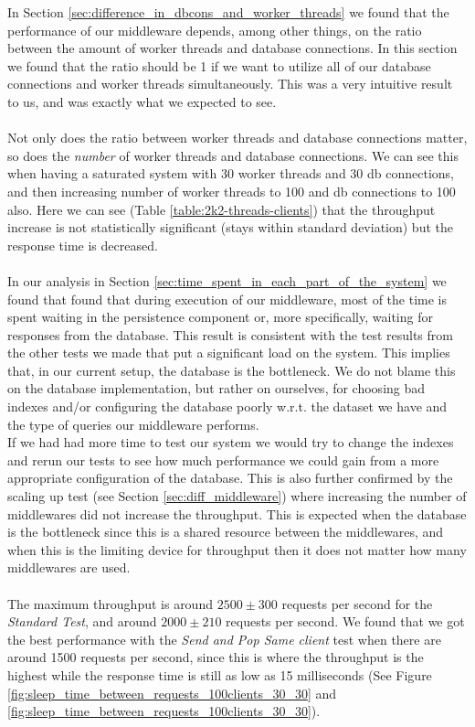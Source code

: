 \documentclass{article}
\begin{document}
        In Section \ref{sec:difference_in_dbcons_and_worker_threads} we found that the performance of our middleware depends, among other things, on the ratio between the amount of worker threads and database connections. In this section we found that the ratio should be 1 if we want to utilize all of our database connections and worker threads simultaneously. This was a very intuitive result to us, and was exactly what we expected to see.\\
        \\
        Not only does the ratio between worker threads and database connections matter, so does the \textit{number} of worker threads and database connections. We can see this when having a saturated system with 30 worker threads and 30 db connections, and then increasing number of worker threads to 100 and db connections to 100 also. Here we can see (Table \ref{table:2k2-threads-clients}) that the throughput increase is not statistically significant (stays within standard deviation) but the response time is decreased.\\
        \\
        In our analysis in Section \ref{sec:time_spent_in_each_part_of_the_system} we found that found that during execution of our middleware, most of the time is spent waiting in the persistence component or, more specifically, waiting for responses from the database. This result is consistent with the test results from the other tests we made that put a significant load on the system. This implies that, in our current setup, the database is the bottleneck. We do not blame this on the database implementation, but rather on ourselves, for choosing bad indexes and/or configuring the database poorly w.r.t. the dataset we have and the type of queries our middleware performs.\\
        If we had had more time to test our system we would try to change the indexes and rerun our tests to see how much performance we could gain from a more appropriate configuration of the database. This is also further confirmed by the scaling up test (see Section \ref{sec:diff_middleware}) where increasing the number of middlewares did not increase the throughput. This is expected when the database is the bottleneck since this is a shared resource between the middlewares, and when this is the limiting device for throughput then it does not matter how many middlewares are used.\\
        \\
        The maximum throughput is around $2500 \pm 300$ requests per second for the \textit{Standard Test}, and around $2000 \pm 210$ requests per second. We found that we got the best performance with the \textit{Send and Pop Same client} test when there are around 1500 requests per second, since this is where the throughput is the highest while the response time is still as low as 15 milliseconds (See Figure \ref{fig:sleep_time_between_requests_100clients_30_30} and \ref{fig:sleep_time_between_requests_100clients_30_30}).
    \clearpage
    \appendix
\end{document}
